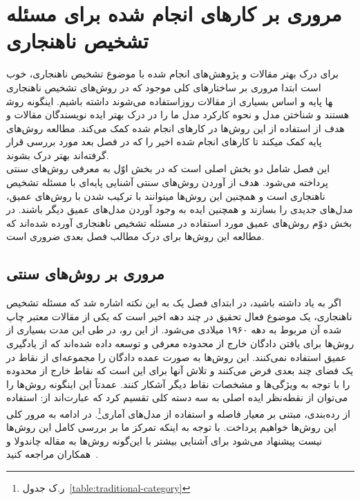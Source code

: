 \documentclass[12pt,a4paper]{report}
\theoremstyle{definition}
\theoremstyle{definition}
\begin{document}
\chapter{مروری بر کارهای انجام شده برای مسئله تشخیص ناهنجاری}

برای درک بهتر مقالات و پژوهش‌های انجام شده با موضوع تشخیص ناهنجاری، خوب است ابتدا مروری بر ساختار‌های کلی موجود که در روش‌های تشخیص ناهنجاری استفاده می‌شوند داشته باشیم. اینگونه روش‎ها پایه و اساس بسیاری از مقالات روز هستند و شناختن مدل و نحوه کارکرد مدل ما را در درک بهتر ایده نویسندگان مقالات و هدف از استفاده از این روش‌ها در کارهای انجام شده کمک می‌کند. مطالعه روش‌های پایه کمک میکند تا کارهای انجام شده اخیر را که در فصل بعد مورد بررسی قرار گرفته‌اند بهتر درک بشوند. \\

این فصل شامل دو بخش اصلی است که در بخش اوّل به معرفی روش‌های سنتی پرداخته می‌شود. هدف از آوردن روش‌های سنتی آشنایی پایه‌ای با مسئله تشخیص ناهنجاری است و همچنین این روش‌ها میتوانند با ترکیب شدن با روش‌های عمیق،‌ مدل‌های جدیدی را بسازند و همچنین ایده به وجود آوردن مدل‌های عمیق دیگر باشند. در بخش دوّم روش‌های عمیق مورد استفاده در مسئله تشخیص ناهنجاری آورده شده‌اند که مطالعه این روش‌ها برای درک مطالب فصل بعدی ضروری است.
\section{مروری بر روش‌های سنتی}
	اگر به‌ یاد داشته باشید، در ابتدای فصل یک به این نکته اشاره شد که مسئله تشخیص ناهنجاری، یک موضوع فعال تحقیق در چند دهه اخیر است که یکی از مقالات معتبر چاپ شده آن مربوط به دهه ۱۹۶۰ میلادی می‌شود. از این رو، در طی این مدت بسیاری از روش‌ها برای یافتن دادگان خارج از محدوده معرفی و توسعه داده شده‌اند که از یادگیری عمیق استفاده نمی‌کنند. این روش‌ها به صورت عمده دادگان را مجموعه‌ای از نقاط در یک فضای چند بعدی فرض می‌کنند و تلاش آنها برای این است که نقاط خارج از محدوده را با توجه به ویژگی‌ها و مشخصات نقاط دیگر آشکار کنند. عمدتاً این اینگونه روش‌ها را می‌توان از نقطه‌نظر ایده اصلی به سه دسته کلی تقسیم کرد که عبارت‌اند از: استفاده از رده‌بندی، مبتنی بر معیار فاصله و استفاده از مدل‌های آماری\footnote{ر.ک جدول~\ref{table:traditional-category}}. در ادامه به مرور کلی این روش‌ها خواهیم پرداخت. با توجه به اینکه تمرکز ما بر بررسی کامل این روش‌ها نیست پیشنهاد می‌شود برای آشنایی بیشتر با این‌گونه روش‌ها به مقاله چاندولا و همکاران مراجعه کنید~\cite{V.Chandola}.
	
\end{document}
